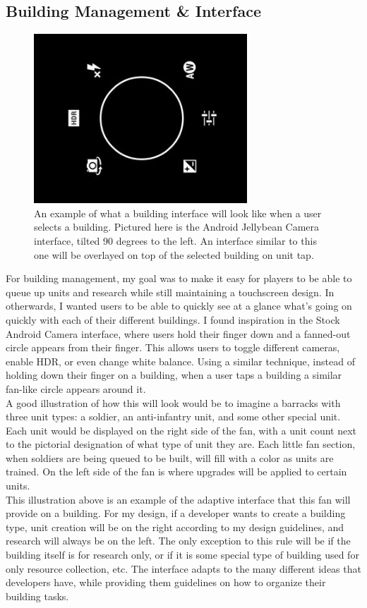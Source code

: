 \documentclass[11pt]{article}
\begin{document}
	\subsection{Building Management \& Interface}
	\begin{figure}[h]
	\begin{center}
	\includegraphics[height = 2.5in]{android-camera}
	\caption{An example of what a building interface will look like when a user selects a building. Pictured here is the Android Jellybean Camera interface, tilted 90 degrees to the left. An interface similar to this one will be overlayed on top of the selected building on unit tap.}
	\end{center}
	\end{figure}
	For building management, my goal was to make it easy for players to be able to queue up units and research while still maintaining a touchscreen design. In otherwards, I wanted users to be able to quickly see at a glance what's going on quickly with each of their different buildings. I found inspiration in the Stock Android Camera interface, where users hold their finger down and a fanned-out circle appears from their finger. This allows users to toggle different cameras, enable HDR, or even change white balance. Using a similar technique, instead of holding down their finger on a building, when a user taps a building a similar fan-like circle appears around it. \\
	\indent A good illustration of how this will look would be to imagine a barracks with three unit types: a soldier, an anti-infantry unit, and some other special unit. Each unit would be displayed on the right side of the fan, with a unit count next to the pictorial designation of what type of unit they are. Each little fan section, when soldiers are being queued to be built, will fill with a color as units are trained. On the left side of the fan is where upgrades will be applied to certain units. \\
	\indent This illustration above is an example of the adaptive interface that this fan will provide on a building. For my design, if a developer wants to create a building type, unit creation will be on the right according to my design guidelines, and research will always be on the left. The only exception to this rule will be if the building itself is for research only, or if it is some special type of building used for only resource collection, etc. The interface adapts to the many different ideas that developers have, while providing them guidelines on how to organize their building tasks.
\end{document}
